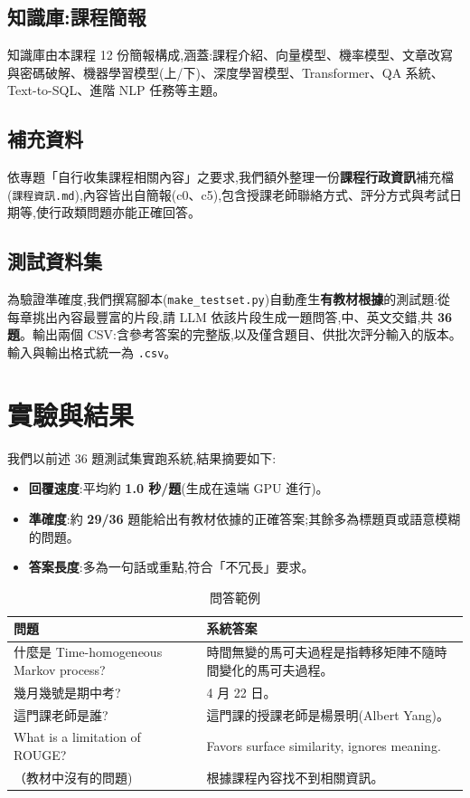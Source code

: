 \documentclass[12pt]{ctexart}
\begin{document}
\subsection{知識庫:課程簡報}
知識庫由本課程 12 份簡報構成,涵蓋:課程介紹、向量模型、機率模型、文章改寫與密碼破解、機器學習模型(上/下)、深度學習模型、Transformer、QA 系統、Text-to-SQL、進階 NLP 任務等主題。

\subsection{補充資料}
依專題「自行收集課程相關內容」之要求,我們額外整理一份\textbf{課程行政資訊}補充檔(\texttt{課程資訊.md}),內容皆出自簡報(c0、c5),包含授課老師聯絡方式、評分方式與考試日期等,使行政類問題亦能正確回答。

\subsection{測試資料集}
為驗證準確度,我們撰寫腳本(\texttt{make\_testset.py})自動產生\textbf{有教材根據}的測試題:從每章挑出內容最豐富的片段,請 LLM 依該片段生成一題問答,中、英文交錯,共 \textbf{36 題}。輸出兩個 CSV:含參考答案的完整版,以及僅含題目、供批次評分輸入的版本。輸入與輸出格式統一為 \texttt{.csv}。

\section{實驗與結果}
我們以前述 36 題測試集實跑系統,結果摘要如下:
\begin{itemize}[leftmargin=2em]
  \item \textbf{回覆速度}:平均約 \textbf{1.0 秒/題}(生成在遠端 GPU 進行)。
  \item \textbf{準確度}:約 \textbf{29/36} 題能給出有教材依據的正確答案;其餘多為標題頁或語意模糊的問題。
  \item \textbf{答案長度}:多為一句話或重點,符合「不冗長」要求。
\end{itemize}

\begin{table}[h]
\centering
\caption{問答範例}
\label{tab:examples}
\begin{tabular}{p{6.2cm}p{7cm}}
\toprule
\textbf{問題} & \textbf{系統答案} \\
\midrule
什麼是 Time-homogeneous Markov process? & 時間無變的馬可夫過程是指轉移矩陣不隨時間變化的馬可夫過程。 \\
幾月幾號是期中考? & 4 月 22 日。 \\
這門課老師是誰? & 這門課的授課老師是楊景明(Albert Yang)。 \\
What is a limitation of ROUGE? & Favors surface similarity, ignores meaning. \\
（教材中沒有的問題) & 根據課程內容找不到相關資訊。 \\
\bottomrule
\end{tabular}
\end{table}
\end{document}
